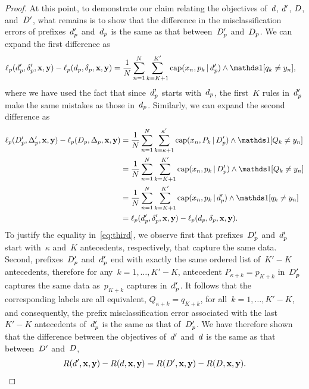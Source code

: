 \begin{arxiv}
\begin{proof}
At this point, to demonstrate our claim relating the objectives
of~${d}$, ${d}'$, ${D}$, and~${D}'$, what remains is to
show that the difference in the misclassification errors
of prefixes~$d_p'$ and~$d_p$ is the same as that
between~$D_p'$ and~$D_p$.
%
We can expand the first difference as
\begin{align}
\Loss_p(\Prefix', \Labels', \x, \y) - \Loss_p(\Prefix, \Labels, \x, \y)
&= \frac{1}{N} \sum_{n=1}^N \sum_{k=K+1}^{K'}
  \Cap(x_n, p_k \given \Prefix') \wedge \one [ q_k \neq y_n ],
\end{align}
where we have used the fact that since~$d_p'$
starts with~$d_p$, the first~$K$ rules in~$d_p'$
make the same mistakes as those in~$d_p$.
%
Similarly, we can expand the second difference as
\begin{align}
\Loss_p(\PrefixB', \LabelsB', \x, \y) - \Loss_p(\PrefixB, \LabelsB, \x, \y)
&= \frac{1}{N} \sum_{n=1}^N \sum_{k=\kappa+1}^{\kappa'}
  \Cap(x_n, P_k \given \PrefixB') \wedge \one [ Q_k \neq y_n ] \nn \\
&= \frac{1}{N} \sum_{n=1}^N \sum_{k=K+1}^{K'}
  \Cap(x_n, p_k \given \PrefixB') \wedge \one [ Q_k \neq y_n ] \nn \\
&= \frac{1}{N} \sum_{n=1}^N \sum_{k=K+1}^{K'}
  \Cap(x_n, p_k \given \Prefix') \wedge \one [ q_k \neq y_n ] \label{eq:third} \\
&= \Loss_p(\Prefix', \Labels', \x, \y) - \Loss_p(\Prefix, \Labels, \x, \y) \nn.
\end{align}
To justify the equality in~\eqref{eq:third}, we observe first that
prefixes~$D_p'$ and~$d_p'$ start with~$\kappa$ and~$K$
antecedents, respectively, that capture the same data.
%
Second, prefixes~$D_p'$ and~$d_p'$ end with exactly
the same ordered list of~${K' - K}$ antecedents,
therefore for any~${k = 1, \dots, K' - K}$,
antecedent ${P_{\kappa + k} = p_{K + k}}$ in~$D_p'$
captures the same data as~$p_{K + k}$ captures in~$d_p'$.
%
It follows that the corresponding labels are all equivalent, \ie
${Q_{\kappa + k} = q_{K + k}}$, for all~${k = 1, \dots, K' - K}$,
and consequently, the prefix misclassification error associated
with the last~${K' - K}$ antecedents of~$d_p'$ is the same
as that of~$D_p'$.
%
We have therefore shown that the difference between the objectives
of~${d}'$ and~${d}$ is the same as that between~${D}'$ and~${D}$, \ie
\begin{align}
\Obj(\RL', \x, \y) - \Obj(\RL, \x, \y)
= \Obj(\RLB', \x, \y) - \Obj(\RLB, \x, \y).
\label{eq:equiv-analogous}
\end{align}


\end{proof}
\end{arxiv}
